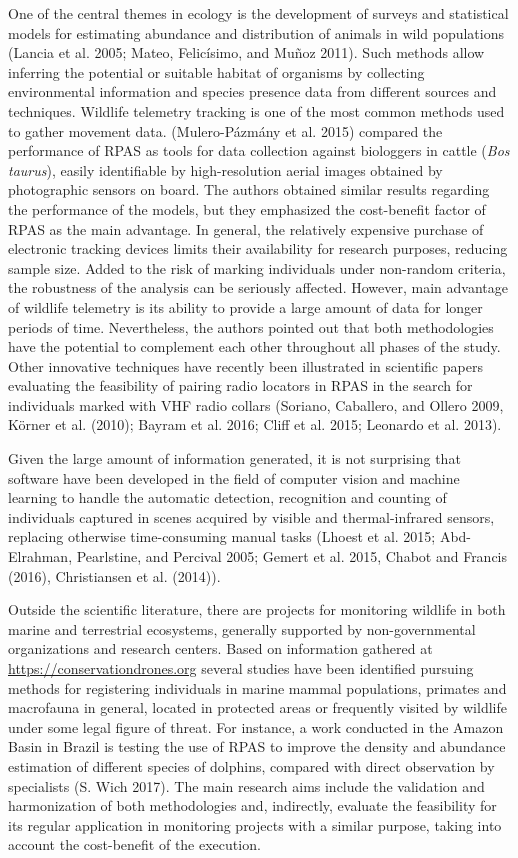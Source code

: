 \documentclass[]{interact}
\theoremstyle{plain}%
\theoremstyle{definition}
\theoremstyle{remark}
\begin{document}
One of the central themes in ecology is the development of surveys and
statistical models for estimating abundance and distribution of animals
in wild populations (Lancia et al. 2005; Mateo, Felicísimo, and Muñoz
2011). Such methods allow inferring the potential or suitable habitat of
organisms by collecting environmental information and species presence
data from different sources and techniques. Wildlife telemetry tracking
is one of the most common methods used to gather movement data.
(Mulero-Pázmány et al. 2015) compared the performance of RPAS as tools
for data collection against biologgers in cattle (\emph{Bos taurus}),
easily identifiable by high-resolution aerial images obtained by
photographic sensors on board. The authors obtained similar results
regarding the performance of the models, but they emphasized the
cost-benefit factor of RPAS as the main advantage. In general, the
relatively expensive purchase of electronic tracking devices limits
their availability for research purposes, reducing sample size. Added to
the risk of marking individuals under non-random criteria, the
robustness of the analysis can be seriously affected. However, main
advantage of wildlife telemetry is its ability to provide a large amount
of data for longer periods of time. Nevertheless, the authors pointed
out that both methodologies have the potential to complement each other
throughout all phases of the study. Other innovative techniques have
recently been illustrated in scientific papers evaluating the
feasibility of pairing radio locators in RPAS in the search for
individuals marked with VHF radio collars (Soriano, Caballero, and
Ollero 2009, Körner et al. (2010); Bayram et al. 2016; Cliff et al.
2015; Leonardo et al. 2013).

Given the large amount of information generated, it is not surprising
that software have been developed in the field of computer vision and
machine learning to handle the automatic detection, recognition and
counting of individuals captured in scenes acquired by visible and
thermal-infrared sensors, replacing otherwise time-consuming manual
tasks (Lhoest et al. 2015; Abd-Elrahman, Pearlstine, and Percival 2005;
Gemert et al. 2015, Chabot and Francis (2016), Christiansen et al.
(2014)).

Outside the scientific literature, there are projects for monitoring
wildlife in both marine and terrestrial ecosystems, generally supported
by non-governmental organizations and research centers. Based on
information gathered at \url{https://conservationdrones.org} several
studies have been identified pursuing methods for registering
individuals in marine mammal populations, primates and macrofauna in
general, located in protected areas or frequently visited by wildlife
under some legal figure of threat. For instance, a work conducted in the
Amazon Basin in Brazil is testing the use of RPAS to improve the density
and abundance estimation of different species of dolphins, compared with
direct observation by specialists (S. Wich 2017). The main research aims
include the validation and harmonization of both methodologies and,
indirectly, evaluate the feasibility for its regular application in
monitoring projects with a similar purpose, taking into account the
cost-benefit of the execution.
\end{document}

